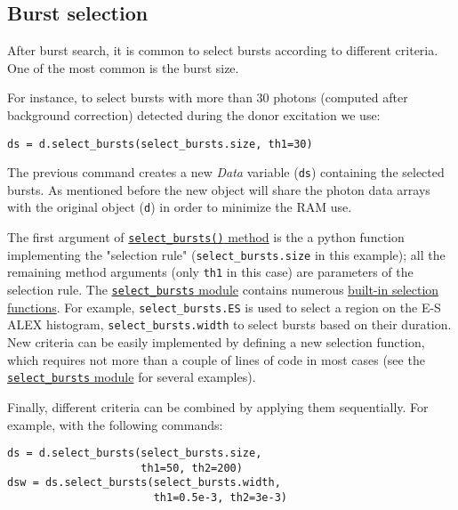 \subsection{Burst selection}
\label{sec:burstsel}

After burst search, it is common to select bursts according to different
criteria. One of the most common is the burst size.

For instance, to select bursts with more than 30 photons (computed
after background correction) detected during the donor excitation
we use:

\begin{verbatim}
ds = d.select_bursts(select_bursts.size, th1=30)
\end{verbatim}

The previous command creates a new \textit{Data} variable (\verb|ds|) containing
the selected bursts.
As mentioned before the new object will share the photon data
arrays with the original object (\verb|d|) in order to minimize the RAM use.

The first argument of 
\href{http://fretbursts.readthedocs.org/en/latest/data_class.html#burst-selection-methods}{\texttt{select\_bursts()} method}
is the a python function implementing the "selection rule" (\verb|select_bursts.size| in this example);
all the remaining method arguments (only \verb|th1| in this case) are parameters of the selection rule.
The \href{http://fretbursts.readthedocs.org/en/latest/burst_selection.html}{\texttt{select\_bursts} module}
contains numerous
\href{http://fretbursts.readthedocs.org/en/latest/burst_selection.html#module-fretbursts.select_bursts}{built-in selection functions}.
For example,
\verb|select_bursts.ES|
is used to select a region on the E-S ALEX histogram,
\verb|select_bursts.width|
to select bursts based on their duration.
New criteria can be easily implemented by defining a new selection function,
which requires not more than a couple of lines of code in most cases (see the
\href{https://github.com/tritemio/FRETBursts/blob/master/fretbursts/select\_bursts.py}{\texttt{select\_bursts} module} for several examples).

Finally, different criteria can be combined by applying them sequentially.
For example, with the following commands:

\begin{verbatim}
ds = d.select_bursts(select_bursts.size,
                     th1=50, th2=200)
dsw = ds.select_bursts(select_bursts.width,
                       th1=0.5e-3, th2=3e-3)
\end{verbatim}

